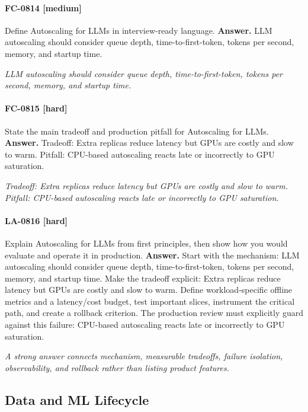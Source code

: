 \paragraph{FC-0814 [medium]} Define Autoscaling for LLMs in interview-ready language.
\noindent\textbf{Answer.} LLM autoscaling should consider queue depth, time-to-first-token, tokens per second, memory, and startup time.
\par\textit{LLM autoscaling should consider queue depth, time-to-first-token, tokens per second, memory, and startup time.}
\paragraph{FC-0815 [hard]} State the main tradeoff and production pitfall for Autoscaling for LLMs.
\noindent\textbf{Answer.} Tradeoff: Extra replicas reduce latency but GPUs are costly and slow to warm. Pitfall: CPU-based autoscaling reacts late or incorrectly to GPU saturation.
\par\textit{Tradeoff: Extra replicas reduce latency but GPUs are costly and slow to warm. Pitfall: CPU-based autoscaling reacts late or incorrectly to GPU saturation.}
\paragraph{LA-0816 [hard]} Explain Autoscaling for LLMs from first principles, then show how you would evaluate and operate it in production.
\noindent\textbf{Answer.} Start with the mechanism: LLM autoscaling should consider queue depth, time-to-first-token, tokens per second, memory, and startup time. Make the tradeoff explicit: Extra replicas reduce latency but GPUs are costly and slow to warm. Define workload-specific offline metrics and a latency/cost budget, test important slices, instrument the critical path, and create a rollback criterion. The production review must explicitly guard against this failure: CPU-based autoscaling reacts late or incorrectly to GPU saturation.
\par\textit{A strong answer connects mechanism, measurable tradeoffs, failure isolation, observability, and rollback rather than listing product features.}
\subsection{Data and ML Lifecycle}
